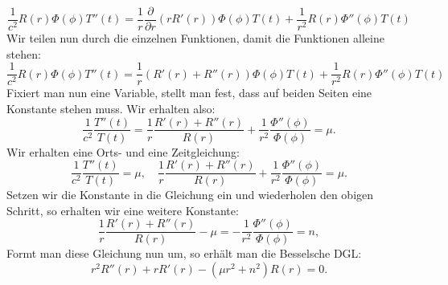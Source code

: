 \begin{equation}
\frac{1}{c^2} R(r) \Phi(\phi) T''(t) = \frac{1}{r} \frac{\partial}{\partial r}(r R'(r)) \Phi(\phi) T(t) + \frac{1}{r^2} R(r) \Phi''(\phi) T(t)
\end{equation}
Wir teilen nun durch die einzelnen Funktionen, damit die Funktionen alleine stehen:
\begin{equation}
\frac{1}{c^2} R(r) \Phi(\phi) T''(t) = \frac{1}{r} (R'(r) + R''(r)) \Phi(\phi) T(t) + \frac{1}{r^2} R(r) \Phi''(\phi) T(t)
\end{equation}
Fixiert man nun eine Variable, stellt man fest, dass auf beiden Seiten eine Konstante stehen muss. Wir erhalten also:
\begin{equation}
\frac{1}{c^2}
\frac{T''(t)}{T(t)} = 
\frac{1}{r} 
\frac{R'(r) + R''(r)}{R(r)} + 
\frac{1}{r^2}
\frac{\Phi''(\phi)}{\Phi(\phi)} = \mu
.
\end{equation}
Wir erhalten eine Orts- und eine Zeitgleichung:
\begin{equation}
\frac{1}{c^2} 
\frac{T''(t)}{T(t)} = 
\mu
,\quad
\frac{1}{r} \frac{R'(r) + R''(r)}{R(r)} + 
\frac{1}{r^2} \frac{\Phi''(\phi)}{\Phi(\phi)} = 
\mu
.
\end{equation}
Setzen wir die Konstante in die Gleichung ein und wiederholen den obigen Schritt, so erhalten wir eine weitere Konstante:
\begin{equation}
\frac{1}{r} \frac{R'(r) + R''(r)}{R(r)} - \mu =
-\frac{1}{r^2} \frac{\Phi''(\phi)}{\Phi(\phi)} = n
,
\end{equation}
Formt man diese Gleichung nun um, so erhält man die Besselsche DGL:
\begin{equation}
r^2 R''(r) + r R'(r) - (\mu r^2 + n^2)R(r) = 0
\label{eq:besselsche_dgl}
.
\end{equation}

